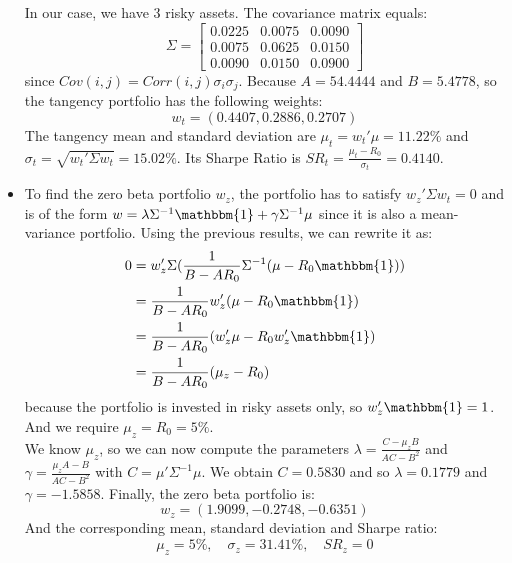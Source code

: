 \documentclass[10pt]{article}
\newenvironment{exercise}[2][Exercise]{\begin{trivlist}
  \item[\hskip \labelsep {\bfseries #1}\hskip \labelsep {\bfseries #2.}]}{\end{trivlist}}
\begin{document}
\begin{exercise}{1}
\begin{itemize}
    In our case, we have $3$ risky assets. The covariance matrix equals:
    $$ \Sigma = \left[ {\begin{array}{ccc}
      0.0225  &  0.0075  &  0.0090\\
      0.0075  &  0.0625  &  0.0150\\
      0.0090  &  0.0150  &  0.0900
    \end{array} } \right]$$ since $Cov(i,j) = Corr(i,j)\sigma_i\sigma_j$. Because $A = 54.4444$ and $B = 5.4778$, so the tangency portfolio has the following weights: $$ w_t = (0.4407, 0.2886, 0.2707)$$ 
    The tangency mean and standard deviation are $\mu_t = w_t'\mu = 11.22\%$ and $\sigma_t = \sqrt{w_t'\Sigma w_t} = 15.02\%$. Its Sharpe Ratio is $SR_t = \frac{\mu_t - R_0}{\sigma_t} = 0.4140$. 
    \item To find the zero beta portfolio $w_z$, the portfolio has to satisfy $w_z'\Sigma w_t = 0$ and is of the form $w = \lambda\Sigma^{-1}\mathbbm{1}+ \gamma\Sigma^{-1}\mu$ since it is also a mean-variance portfolio. Using the previous results, we can rewrite it as:
    \begin{align*}
      0 &= w_z'\Sigma(\frac{1}{B-AR_0}\Sigma^{-1}(\mu-R_0\mathbbm{1})) \\
      &= \frac{1}{B-AR_0}w_z'(\mu-R_0\mathbbm{1}) \\
      &= \frac{1}{B-AR_0}(w_z'\mu - R_0w_z'\mathbbm{1}) \\
      &= \frac{1}{B-AR_0}(\mu_z - R_0)
    \end{align*} because the portfolio is invested in risky assets only, so $w_z'\mathbbm{1} = 1$. And we require $\mu_z = R_0 = 5\%$. 
    \\
    We know $\mu_z$, so we can now compute the parameters $\lambda = \frac{C-\mu_zB}{AC-B^2}$ and $\gamma = \frac{\mu_zA-B}{AC-B^2}$ with $C = \mu'\Sigma^{-1}\mu$. 
    We obtain $C = 0.5830$ and so $\lambda= 0.1779$ and $\gamma = -1.5858$. 
    Finally, the zero beta portfolio is: 
    $$ w_z = (1.9099, -0.2748, -0.6351)$$
    And the corresponding mean, standard deviation and Sharpe ratio: 
    $$ \mu_z = 5\%, \quad \sigma_z = 31.41\%, \quad SR_z = 0$$
  \end{itemize}

\end{exercise}
  
\end{document}
